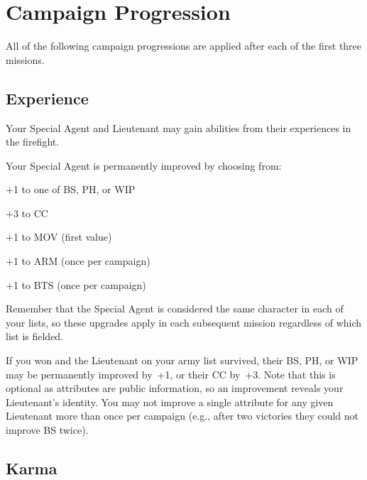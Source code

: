 \chapter{Campaign Progression}

All of the following campaign progressions are applied after each of
the first three missions.

\section{Experience}

Your Special Agent and Lieutenant may gain abilities from their
experiences in the firefight.

  Your Special Agent is permanently
improved by choosing from:

\begin{squishitemize}
\item +1 to one of BS, PH, or WIP
\item +3 to CC
\item +1 to MOV (first value)
\item +1 to ARM (once per campaign)
\item +1 to BTS (once per campaign)
\end{squishitemize}

Remember that the Special Agent is considered the same character in
each of your lists, so these upgrades apply in each subsequent mission
regardless of which list is fielded.

  If you won and the Lieutenant on your army
list survived, their BS, PH, or WIP may be permanently improved by~+1,
or their CC by~+3.  Note that this is optional as attributes are
public information, so an improvement reveals your Lieutenant's
identity.  You may not improve a single attribute for any given
Lieutenant more than once per campaign (e.g., after two victories they
could not improve BS twice).

\section{Karma}

